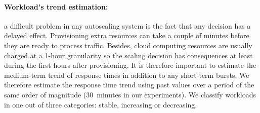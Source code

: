 
\paragraph{Workload's trend estimation:} 
a difficult problem in any autoscaling system is the fact that any
decision has a delayed effect. Provisioning extra resources can take a
couple of minutes before they are ready to process traffic. Besides,
cloud computing resources are usually charged at a 1-hour granularity
so the scaling decision has consequences at least during the first
hours after provisioning. It is therefore important to estimate the
medium-term trend of response times in addition to any short-term
bursts. We therefore estimate the response time trend using past values
over a period of the same order of magnitude (30\ minutes in our
experiments). We classify workloads in one out of three categories:
stable, increasing or decreasing. 


